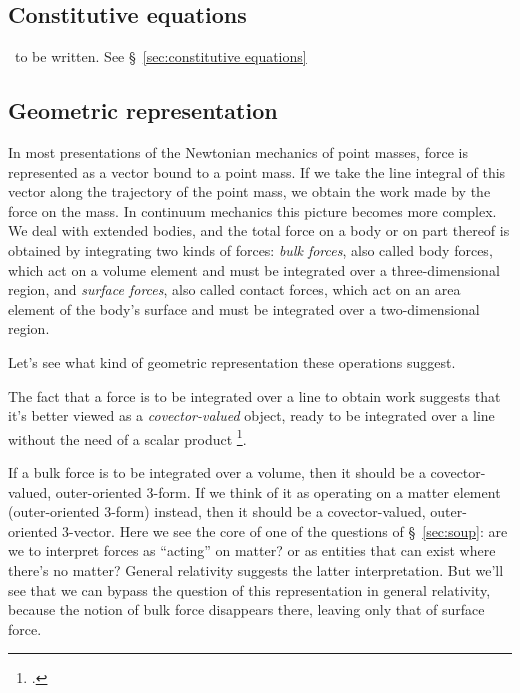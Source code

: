 \documentclass[\ifafour a4paper,12pt,\else a5paper,10pt,\fi%
onecolumn,oneside,article,%
british%
]{memoir}
\theoremstyle{remark}
\theoremstyle{innote}
\newcommand*{\citep}{\footcites}
\renewcommand*{\|}[1][]{\nonscript\,#1\vert\nonscript\;\mathopen{}}
\newcommand*{\sect}{\S}%
\newcommand*{\chap}{ch.}%
\newcommand*{\chaps}{chs}%
\newcommand*{\puzzle}{{\fontencoding{U}\fontfamily{fontawesometwo}\selectfont\symbol{225}}}
\newcommand{\mynote}[1]{ {\color{notecolour}\puzzle\ #1}}
\begin{document}
\subsection{Constitutive equations}
\label{sec:constit_eq}

\mynote{to be written. See \sect~\ref{sec:constitutive equations}}


\subsection{Geometric representation}
\label{sec:geometry_force}

In most presentations of the Newtonian mechanics of point masses, force is
represented as a vector bound to a point mass. If we take the line integral
of this vector along the trajectory of the point mass, we obtain the work
made by the force on the mass. In continuum mechanics this picture becomes
more complex. We deal with extended bodies, and the total force on a body
or on part thereof is obtained by integrating two kinds of forces:
\emph{bulk forces}, also called body forces, which act on a volume element
and must be integrated over a three-dimensional region, and \emph{surface
  forces}, also called contact forces, which act on an area element of the
body's surface and must be integrated over a two-dimensional region.

Let's see what kind of geometric representation these operations suggest.

The fact that a force is to be integrated over a line to obtain work
suggests that it's better viewed as a \emph{covector-valued} object, ready
to be integrated over a line without the need of a scalar product
\citep[\sect~12]{burke1995}[\sect~VII.2]{schouten1951}[\sect~2]{vandantzig1954}[\chaps~VI--VII]{burke1985_r1987}[\chap~7]{bambergetal1988_r1990}.

If a bulk force is to be integrated over a volume, then it should be a
covector-valued, outer-oriented 3-form. If we think of it as operating on a
matter element (outer-oriented 3-form) instead, then it should be a
covector-valued, outer-oriented 3-vector. Here we see the core of one of
the questions of \sect~\ref{sec:soup}: are we to interpret forces as
\enquote{acting} on matter? or as entities that can exist where there's no
matter? General relativity suggests the latter interpretation. But we'll
see that we can bypass the question of this representation in general
relativity, because the notion of bulk force disappears there, leaving only
that of surface force.
\end{document}

